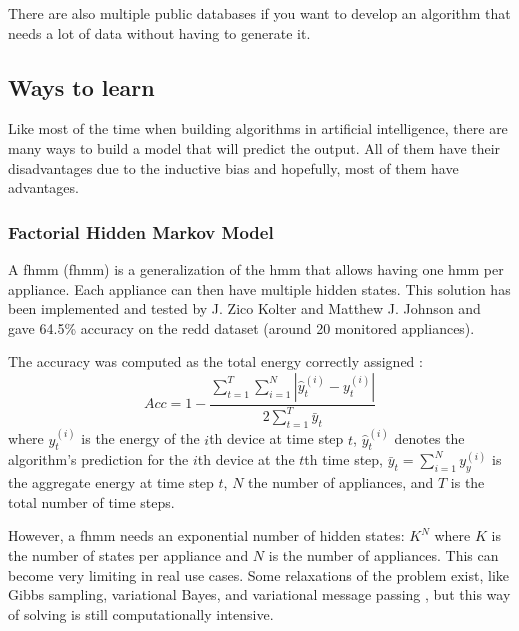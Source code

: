 There are also multiple public databases if you want to develop an algorithm that needs a lot of data without having to generate it.%




\subsection{Ways to learn}\label{setion:learn}
Like most of the time when building algorithms in artificial intelligence, there are many ways to build a model that will predict the output. All of them have their disadvantages due to the inductive bias and hopefully, most of them have advantages.
\subsubsection{Factorial Hidden Markov Model}
A \acrlong{fhmm} (\acrshort{fhmm}) is a generalization of the \acrshort{hmm} that allows having one \acrshort{hmm} per appliance. \cite{parson2014unsupervised} Each appliance can then have multiple hidden states. This solution has been implemented and tested by J. Zico Kolter and Matthew J. Johnson \cite{kolter2011redd} and gave 64.5\% accuracy on the \acrshort{redd} dataset (around 20 monitored appliances).

The accuracy was computed as the total energy correctly assigned :
\begin{equation}Acc=1-\frac{\sum_{t=1}^{T}\sum_{i=1}^{N}|\hat{y}_t^{(i)}-y_t^{(i)}|}{2\sum_{t=1}^{T} \bar{y}_t}\end{equation}
where $y_t^{(i)}$ is the energy of the $i$th device at time step $t$, $\hat{y}_t^{(i)}$ denotes the algorithm’s prediction for the $i$th device at the $t$th time step, $\bar{y}_t=\sum_{i=1}^{N}y_y^{(i)}$ is the aggregate energy at time step $t$, $N$ the number of appliances, and $T$ is the total number of time steps.

However, a \acrshort{fhmm} needs an exponential number of hidden states: $K^N$ where $K$ is the number of states per appliance and $N$ is the number of appliances. This can become very limiting in real use cases. Some relaxations of the problem exist, like Gibbs sampling, variational Bayes, and variational message passing \cite{parson2014unsupervised}, but this way of solving is still computationally intensive.

